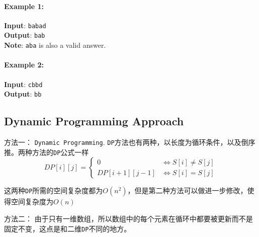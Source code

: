 \paragraph{Example 1:}
\begin{flushleft}
\textbf{Input}: \texttt{babad}
\\
\textbf{Output}: \texttt{bab}
\\
\textbf{Note}:  \texttt{aba} is also a valid answer.
\end{flushleft}
\paragraph{Example 2:}
\begin{flushleft}
\textbf{Input}: \texttt{cbbd}
\\
\textbf{Output}: \texttt{bb}
\end{flushleft}
\subsection{Dynamic Programming Approach}
\begin{CJK*}{UTF8}{gbsn}
方法一： \texttt{Dynamic Programming}. \texttt{DP}方法也有两种，以长度为循环条件，以及倒序推。两种方法的\texttt{DP}公式一样
\[
DP[i][j]  = 
\begin{cases}
 0 & \iff S[i] \neq S[j] \\
 DP[i+1][j-1] &\iff S[i] = S[j]
\end{cases}
\]
\par
这两种\texttt{DP}所需的空间复杂度都为$O(n^2)$，但是第二种方法可以做进一步修改，使得空间复杂度为$O(n)$
\par
方法二： 由于只有一维数组，所以数组中的每个元素在循环中都要被更新而不是固定不变，这点是和二维\texttt{DP}不同的地方。
\end{CJK*}
